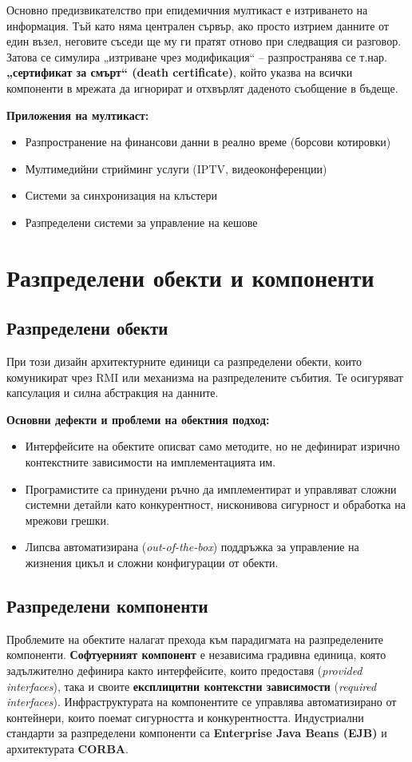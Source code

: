 \documentclass{scrartcl}
\begin{document}
\begin{FlushLeft}
Основно предизвикателство при епидемичния мултикаст е изтриването на информация. Тъй като няма централен сървър, ако просто изтрием данните от един възел, неговите съседи ще му ги пратят отново при следващия си разговор. Затова се симулира „изтриване чрез модификация“ – разпространява се т.нар. \textbf{„сертификат за смърт“ (death certificate)}, който указва на всички компоненти в мрежата да игнорират и отхвърлят даденото съобщение в бъдеще.


\textbf{Приложения на мултикаст:}
\begin{itemize}
    \item Разпространение на финансови данни в реално време (борсови котировки)
    \item Мултимедийни стрийминг услуги (IPTV, видеоконференции)
    \item Системи за синхронизация на клъстери
    \item Разпределени системи за управление на кешове
\end{itemize}

\section{Разпределени обекти и компоненти}

\subsection{Разпределени обекти}
При този дизайн архитектурните единици са разпределени обекти, които комуникират чрез RMI или механизма на разпределените събития. Те осигуряват капсулация и силна абстракция на данните. 

\textbf{Основни дефекти и проблеми на обектния подход:}
\begin{itemize}
    \item Интерфейсите на обектите описват само методите, но не дефинират изрично контекстните зависимости на имплементацията им.
    \item Програмистите са принудени ръчно да имплементират и управляват сложни системни детайли като конкурентност, нисконивова сигурност и обработка на мрежови грешки.
    \item Липсва автоматизирана (\textit{out-of-the-box}) поддръжка за управление на жизнения цикъл и сложни конфигурации от обекти.
\end{itemize}

\subsection{Разпределени компоненти}
Проблемите на обектите налагат прехода към парадигмата на разпределените компоненти. \textbf{Софтуерният компонент} е независима градивна единица, която задължително дефинира както интерфейсите, които предоставя (\textit{provided interfaces}), така и своите \textbf{експлицитни контекстни зависимости} (\textit{required interfaces}).
Инфраструктурата на компонентите се управлява автоматизирано от контейнери, които поемат сигурността и конкурентността. Индустриални стандарти за разпределени компоненти са \textbf{Enterprise Java Beans (EJB)} и архитектурата \textbf{CORBA}.


\end{FlushLeft}
\end{document}
